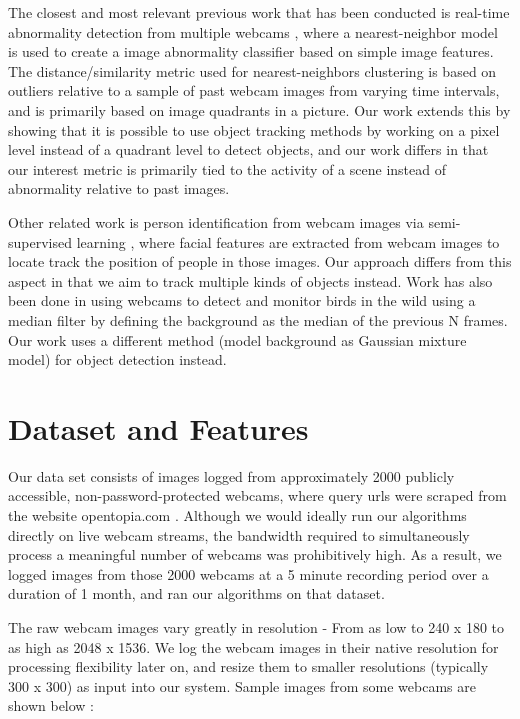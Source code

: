 \documentclass[10pt]{article} %
\begin{document}
The closest and most relevant previous work that has been conducted is real-time abnormality detection from multiple webcams \cite{huntingnessie}, where a nearest-neighbor model is used to create a image abnormality classifier based on simple image features. The distance/similarity metric used for nearest-neighbors clustering is based on outliers relative to a sample of past webcam images from varying time intervals, and is primarily based on image quadrants in a picture. Our work extends this by showing that it is possible to use object tracking methods by working on a pixel level instead of a quadrant level to detect objects, and our work differs in that our interest metric is primarily tied to the activity of a scene instead of abnormality relative to past images. 

Other related work is person identification from webcam images via semi-supervised learning \cite{personidentification}, where facial features are extracted from webcam images to locate track the position of people in those images. Our approach differs from this aspect in that we aim to track multiple kinds of objects instead. Work has also been done in using webcams to detect and monitor birds in the wild \cite{birddetection} using a median filter by defining the background as the median of the previous N frames. Our work uses a different method (model background as Gaussian mixture model) for object detection instead. 

\section{Dataset and Features}
Our data set consists of images logged from approximately 2000 publicly accessible, non-password-protected webcams, where query urls were scraped from the website opentopia.com \cite{opentopia}. Although we would ideally run our algorithms directly on live webcam streams, the bandwidth required to simultaneously process a meaningful number of webcams was prohibitively high. As a result, we logged images from those 2000 webcams at a 5 minute recording period over a duration of 1 month, and ran our algorithms on that dataset. 

The raw webcam images vary greatly in resolution - From as low to 240 x 180 to as high as 2048 x 1536. We log the webcam images in their native resolution for processing flexibility later on, and resize them to smaller resolutions (typically 300 x 300) as input into our system. Sample images from some webcams are shown below :
\end{document}

